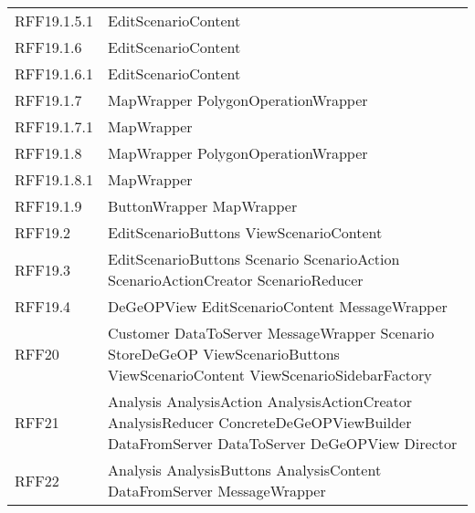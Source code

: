\begin{longtable}{p{2.5cm}!{\VRule[1pt]}p{5cm}}
		RFF19.1.5.1 & EditScenarioContent\\
		RFF19.1.6 & EditScenarioContent\\
		RFF19.1.6.1 & EditScenarioContent\\
		RFF19.1.7 & MapWrapper \newline PolygonOperationWrapper\\
		RFF19.1.7.1 & MapWrapper\\
		RFF19.1.8 & MapWrapper \newline PolygonOperationWrapper\\
		RFF19.1.8.1 & MapWrapper\\
		RFF19.1.9 & ButtonWrapper \newline MapWrapper\\
		RFF19.2 & EditScenarioButtons \newline ViewScenarioContent\\
		RFF19.3 & EditScenarioButtons \newline Scenario \newline ScenarioAction \newline ScenarioActionCreator \newline ScenarioReducer\\
		RFF19.4 & DeGeOPView \newline EditScenarioContent \newline MessageWrapper\\
		RFF20 & Customer \newline DataToServer \newline MessageWrapper \newline Scenario \newline StoreDeGeOP \newline ViewScenarioButtons \newline ViewScenarioContent \newline ViewScenarioSidebarFactory\\
		RFF21 & Analysis \newline AnalysisAction \newline AnalysisActionCreator \newline AnalysisReducer \newline ConcreteDeGeOPViewBuilder \newline DataFromServer \newline DataToServer \newline DeGeOPView \newline Director\\
		RFF22 & Analysis \newline AnalysisButtons \newline AnalysisContent \newline DataFromServer \newline MessageWrapper\\

\end{longtable}
